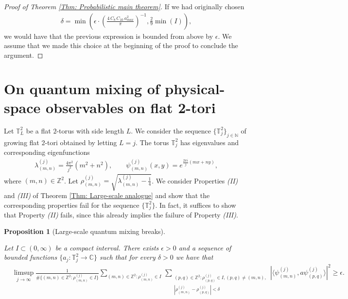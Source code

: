 \documentclass[11pt,twoside,reqno]{amsart} \usepackage{a4wide} \usepackage[T1]{fontenc} \usepackage[utf8]{inputenc} \usepackage{soul}  \usepackage{amsmath} \usepackage{amsfonts} \usepackage{amssymb} \usepackage{mathtools} \usepackage{amsthm} \usepackage{xcolor} \usepackage{graphicx} \usepackage{hyperref} \usepackage{standalone} \usepackage{esint} \usepackage{comment} \usepackage[left=2.3cm,top=3cm,right=2.3cm]{geometry} \usepackage{bm} \usepackage{svg} \usepackage{float} \numberwithin{equation}{section} \theoremstyle{plain} \newtheorem{thm}{Theorem}[section] \newtheorem{theorem}[thm]{Theorem} \newtheorem*{theorem*}{Theorem}\newtheorem{conj}[thm]{Conjecture} \newtheorem{lemma}[thm]{Lemma} \newtheorem{prop}[thm]{Proposition} \newtheorem{proposition}[thm]{Proposition} \newtheorem{cor}[thm]{Corollary} \newtheorem{question}[thm]{Question} \newtheorem{corollary}[thm]{Corollary} \newtheorem{assumption}[thm]{Assumption} \theoremstyle{definition} \newtheorem{defn}[thm]{Definition} \newtheorem{choice}[thm]{Choice} \newtheorem{definition}[thm]{Definition} \newtheorem{ex}[thm]{Example} \newtheorem{notation}[thm]{Notation} \newtheorem*{ack}{Acknowledgements} \theoremstyle{remark} \newtheorem{remark}[thm]{Remark} \newtheorem{bigremark}[thm]{Remark} \usepackage{xcolor} \newcommand{\red}[1]{ {\color{Red}#1} } \newcommand{\blue}[1]{ {\color{Blue}#1} } \author{Kai Hippi} \address{Aalto University, Espoo, Finland} \email{kai.hippi@aalto.fi}
\begin{document}
\begin{proof}[Proof of Theorem \ref{Thm: Probabilistic main theorem}]
	If we had originally chosen
	\begin{align*}
		\delta = \min \left( \epsilon \cdot \left(  \frac{4 \, C_{8} \, C_{10} \, a_{max}^{2} }{\pi} \right)^{-1}, \tfrac{2}{9} \min( I ) \right),
	\end{align*}
	we would have that the previous expression is bounded from above by $ \epsilon $. We assume that we made this choice at the beginning of the proof to conclude the argument.

\end{proof}

\appendix

\section{On quantum mixing of physical-space observables on flat 2-tori}

\label{App: Appendix}


Let $ \mathbb{T}_{L}^{2} $ be a flat $ 2 $-torus with side length $ L $. We consider the sequence $ \{ \mathbb{T}_{j}^{2} \}_{j \in \mathbb{N}} $ of growing flat $ 2 $-tori obtained by letting $ L = j $. The torus $ \mathbb{T}_{j}^{2} $ has eigenvalues and corresponding eigenfunctions
\begin{align*}
	\lambda_{( m,n )}^{( j )} = \frac{4 \pi^{2}}{j^{2}} ( m^{2} + n^{2} ), \qquad \psi_{( m,n )}^{( j )}( x,y ) = e^{ \frac{2 \pi i}{j} ( mx + ny  ) },
\end{align*}
where $ ( m,n ) \in \mathbb{Z}^{2} $. Let $ \rho_{( m,n )}^{( j )} = \sqrt{ \lambda^{( j )}_{( m,n )} - \tfrac{1}{4} } $. We consider Properties \emph{(II)} and \emph{(III)} of Theorem \ref{Thm: Large-scale analogue} and show that the corresponding properties fail for the sequence $ \{ \mathbb{T}_{j}^{2} \} $. In fact, it suffices to show that Property \emph{(II)} fails, since this already implies the failure of Property \emph{(III)}.

\begin{proposition}[Large-scale quantum mixing breaks]
	
	\label{Prp: Large-scale quantum mixing breaks}

	Let $ I \subset ( 0,\infty ) $ be a compact interval. There exists $ \epsilon > 0 $ and a sequence of bounded functions $ \{ a_{j}: \mathbb{T}_{j}^{2} \to \mathbb{C} \} $ such that for every $ \delta > 0 $ we have that
	\begin{align*}
		&
		\limsup_{ j \to \infty} \frac{1}{ \# \{ ( m,n ) \in \mathbb{Z}^{2} : \rho_{( m,n )}^{( j )} \in I \} } \sum_{ ( m,n ) \in \mathbb{Z}^{2} : \rho_{( m,n )}^{( j )} \in I }^{} \, \sum_{ \substack{ ( p,q ) \in \mathbb{Z}^{2} : \rho_{( p,q )}^{( j )} \in I, ( p,q ) \neq ( m,n ), \\ | \rho_{( m,n )}^{( j )} - \rho_{( p,q )}^{( j )} | < \delta } }^{} | \langle \psi_{( m,n )}^{( j )}, a \psi_{( p,q )}^{( j )} \rangle |^{2} \geq \epsilon.
	\end{align*}
	
\end{proposition}
\end{document}

